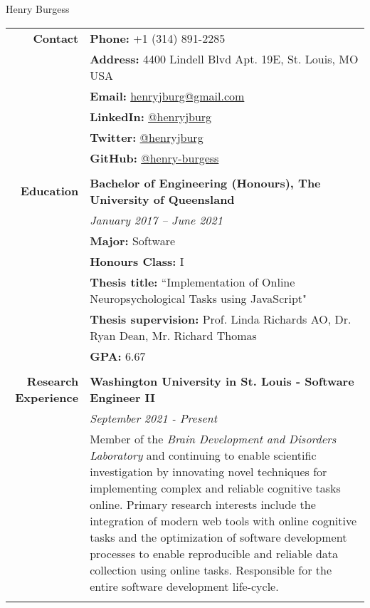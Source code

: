 \documentclass[a4paper]{article}
\begin{document}
\begin{center}
	\Huge{Henry Burgess}
\end{center}

\begin{longtable}{r p{13.5cm}} 
	\textbf{Contact} 		   \vline &	   \textbf{Phone:}  +1 (314) 891-2285 \\ 
										\vline &	\textbf{Address:} 4400 Lindell Blvd Apt. 19E, St. Louis, MO USA \\
										\vline &	\textbf{Email:} \href{mailto:henryjburg@gmail.com}{henryjburg@gmail.com} \\
										\vline &	\textbf{LinkedIn:} \href{https://www.linkedin.com/in/henryjburg/}{@henryjburg} \\			
										\vline &	\textbf{Twitter:} \href{https://www.twitter.com/henryjburg/}{@henryjburg} \\
										\vline &	\textbf{GitHub:} \href{https://github.com/henry-burgess}{@henry-burgess} \\
										\vline & \\
										
	\textbf{Education} 		  \vline & \textbf{Bachelor of Engineering (Honours), The University of Queensland} \\
										\vline & \textit{January 2017 – June 2021} \\
										\vline & \textbf{Major:} Software \\
										\vline & \textbf{Honours Class:} I \\
										\vline & \textbf{Thesis title:} ``Implementation of Online Neuropsychological Tasks using JavaScript" \\
										\vline & \textbf{Thesis supervision:} Prof. Linda Richards AO, Dr. Ryan Dean, Mr. Richard Thomas \\
										\vline & \textbf{GPA:} 6.67 \\
										\vline & \\
										
	\textbf{Research Experience} 	  	\vline & \textbf{Washington University in St. Louis - Software Engineer II} \\
										\vline & \textit{September 2021 - Present} \\
										\vline & Member of the \textit{Brain Development and Disorders Laboratory} and continuing to enable scientific investigation by innovating novel techniques for implementing complex and reliable cognitive tasks online. Primary research interests include the integration of modern web tools with online cognitive tasks and the optimization of software development processes to enable reproducible and reliable data collection using online tasks. Responsible for the entire software development life-cycle. \\ 
										\vline & \\
										

\end{longtable}
\end{document}
